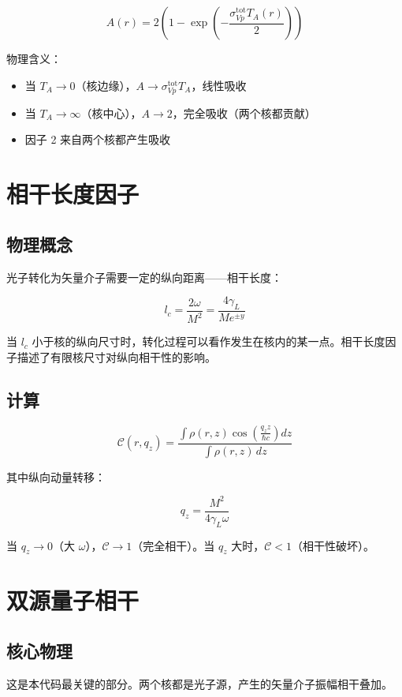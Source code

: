 \documentclass[11pt,a4paper,UTF8]{ctexart}
\begin{document}
\[
A(r) = 2\left(1 - \exp\left(-\frac{\sigma_{Vp}^{\text{tot}} T_A(r)}{2}\right)\right)
\]

物理含义：
\begin{itemize}[leftmargin=2em]
    \item 当 $T_A \to 0$（核边缘），$A \to \sigma_{Vp}^{\text{tot}} T_A$，线性吸收
    \item 当 $T_A \to \infty$（核中心），$A \to 2$，完全吸收（两个核都贡献）
    \item 因子 2 来自两个核都产生吸收
\end{itemize}

\section{相干长度因子}

\subsection{物理概念}

光子转化为矢量介子需要一定的纵向距离——相干长度：

\[
l_c = \frac{2\omega}{M^2} = \frac{4\gamma_L}{M e^{\pm y}}
\]

当 $l_c$ 小于核的纵向尺寸时，转化过程可以看作发生在核内的某一点。相干长度因子描述了有限核尺寸对纵向相干性的影响。

\subsection{计算}

\[
\mathcal{C}(r, q_z) = \frac{\int \rho(r,z) \cos\left(\frac{q_z z}{\hbar c}\right) dz}{\int \rho(r,z)\,dz}
\]

其中纵向动量转移：

\[
q_z = \frac{M^2}{4\gamma_L \omega}
\]

当 $q_z \to 0$（大 $\omega$），$\mathcal{C} \to 1$（完全相干）。当 $q_z$ 大时，$\mathcal{C} < 1$（相干性破坏）。

\section{双源量子相干}

\subsection{核心物理}

这是本代码最关键的部分。两个核都是光子源，产生的矢量介子振幅相干叠加。
\end{document}
